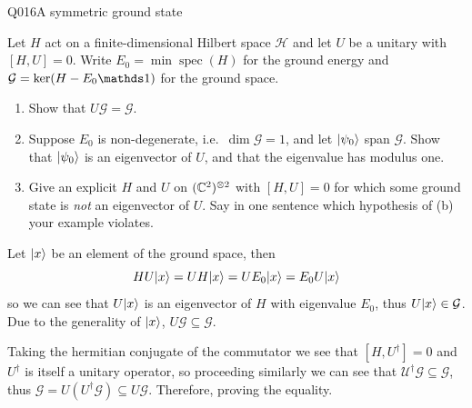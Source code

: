 \begin{entry}{Q016}{A symmetric ground state}


\begin{problem}
Let $H$ act on a finite-dimensional Hilbert space $\mathcal H$ and let $U$ be a unitary
with $[H,U]=0$. Write $E_0=\min\operatorname{spec}(H)$ for the ground energy and
$\mathcal G=\ker(H-E_0\id)$ for the ground space.

\begin{enumerate}[label=\textbf{(\alph*)},leftmargin=*]
  \item Show that $U\mathcal G=\mathcal G$.
  \item Suppose $E_0$ is non-degenerate, i.e.\ $\dim\mathcal G=1$, and let
        $\lvert \psi_0 \rangle$ span $\mathcal G$. Show that $\lvert \psi_0 \rangle$ is an eigenvector of
        $U$, and that the eigenvalue has modulus one.
  \item Give an explicit $H$ and $U$ on $(\mathbb{C}^{2})^{\otimes 2}$ with $[H,U]=0$ for which
        some ground state is \emph{not} an eigenvector of $U$. Say in one sentence which
        hypothesis of (b) your example violates.
\end{enumerate}
\end{problem}


\begin{solution}[Part (a)]
Let $\lvert x \rangle$ be an element of the ground space, then 
\begin{equation}
    HU\lvert x \rangle=UH\lvert x \rangle=UE_0\lvert x \rangle=E_0U\lvert x \rangle
\end{equation}
so we can see that $U\lvert x \rangle$ is an eigenvector of $H$ with eigenvalue $E_0$, thus $U\lvert x \rangle \in \mathcal G$. Due to the generality of $\lvert x \rangle$, $U\mathcal G \subseteq \mathcal G$.

Taking the hermitian conjugate of the commutator we see that $[H, U^\dagger]=0$ and $U^\dagger$ is itself a unitary operator, so proceeding similarly we can see that $\mathcal U^\dagger\mathcal G\subseteq  \mathcal G$, thus 
$\mathcal G = U(U^\dagger \mathcal G) \subseteq U \mathcal G$. Therefore, proving the equality.
\end{solution}


\end{entry}
